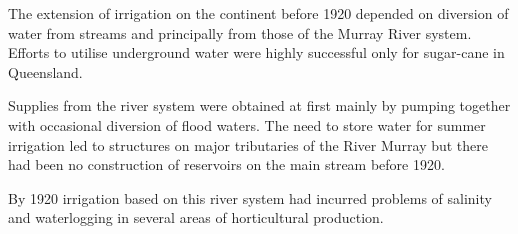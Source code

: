 The extension of irrigation on the continent before 1920 depended on
diversion of water from streams and principally from those of the
Murray River system.  Efforts to utilise underground water were highly
successful only for sugar-cane in Queensland.

Supplies from the river system were obtained at first mainly by
pumping together with occasional diversion of flood waters.  The need
to store water for summer irrigation led to structures on major
tributaries of the River Murray but there had been no construction of
reservoirs on the main stream before 1920.

By 1920 irrigation based on this river system had incurred problems of
salinity and waterlogging in several areas of horticultural
production.



